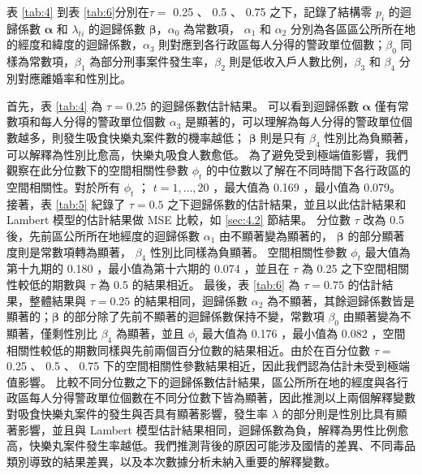 \documentclass[12pt,a4paper]{article}
\begin{document}
\begin{CJK}{UTF8}{bkai}
表 \ref{tab:4} 到表 \ref{tab:6}分別在$\tau =$ 0.25 、 0.5 、 0.75 之下，記錄了結構零 $p_i$ 的迴歸係數 $\bm{\alpha}$ 和 $\lambda_{ti}$ 的迴歸係數 $\bm{\beta}$，$\alpha_0$ 為常數項， $\alpha_1$ 和 $\alpha_2$ 分別為各區區公所所在地的經度和緯度的迴歸係數，$\alpha_3$ 則對應到各行政區每人分得的警政單位個數；$\beta_0$ 同樣為常數項，$\beta_1$ 為部分刑事案件發生率，$\beta_2$ 則是低收入戶人數比例，$\beta_3$ 和 $\beta_4$ 分別對應離婚率和性別比。

首先，表 \ref{tab:4} 為 $\tau = 0.25$ 的迴歸係數估計結果。
可以看到迴歸係數 $\bm{\alpha}$ 僅有常數項和每人分得的警政單位個數 $\alpha_3$ 是顯著的，可以理解為每人分得的警政單位個數越多，則發生吸食快樂丸案件數的機率越低； $\bm{\beta}$ 則是只有 $\beta_4$ 性別比為負顯著，可以解釋為性別比愈高，快樂丸吸食人數愈低。
為了避免受到極端值影響，我們觀察在此分位數下的空間相關性參數 $\phi_t$ 的中位數以了解在不同時間下各行政區的空間相關性。對於所有 $\phi_t$ ； $t=1,\dots,20$ ，最大值為 0.169 ，最小值為 0.079。
接著，表 \ref{tab:5} 紀錄了 $\tau = 0.5$ 之下迴歸係數的估計結果，並且以此估計結果和 Lambert 模型的估計結果做 MSE 比較，如 \ref{sec:4.2} 節結果。
分位數 $\tau$ 改為 0.5 後，先前區公所所在地經度的迴歸係數 $\alpha_1$ 由不顯著變為顯著的， $\bm{\beta}$ 的部分顯著度則是常數項轉為顯著， $\beta_4$ 性別比同樣為負顯著。
空間相關性參數 $\phi_t$ 最大值為第十九期的 0.180 ，最小值為第十六期的 0.074 ，並且在 $\tau$ 為 0.25 之下空間相關性較低的期數與 $\tau$ 為 0.5 的結果相近。
最後，表 \ref{tab:6} 為 $\tau = 0.75$ 的估計結果，整體結果與 $\tau = 0.25$ 的結果相同，迴歸係數 $\alpha_2$ 為不顯著，其餘迴歸係數皆是顯著的；$\bm{\beta}$ 的部分除了先前不顯著的迴歸係數保持不變，常數項 $\beta_0$ 由顯著變為不顯著，僅剩性別比 $\beta_4$ 為顯著，並且 $\phi_t$ 最大值為 0.176 ，最小值為 0.082 ，空間相關性較低的期數同樣與先前兩個百分位數的結果相近。由於在百分位數 $\tau =$ 0.25 、 0.5 、 0.75 下的空間相關性參數結果相近，因此我們認為估計未受到極端值影響。
比較不同分位數之下的迴歸係數估計結果，區公所所在地的經度與各行政區每人分得警政單位個數在不同分位數下皆為顯著，因此推測以上兩個解釋變數對吸食快樂丸案件的發生與否具有顯著影響，發生率 $\lambda$ 的部分則是性別比具有顯著影響，並且與 Lambert 模型估計結果相同，迴歸係數為負，解釋為男性比例愈高，快樂丸案件發生率越低。我們推測背後的原因可能涉及國情的差異、不同毒品類別導致的結果差異，以及本次數據分析未納入重要的解釋變數。




\end{CJK}
\end{document}
